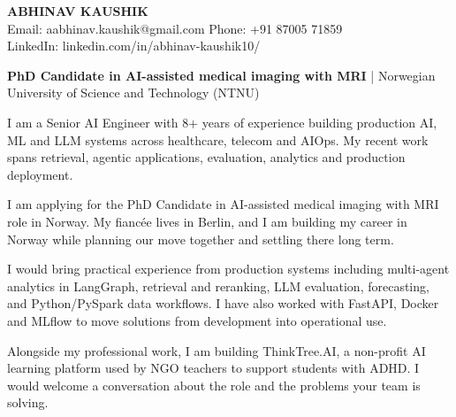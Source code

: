 \documentclass[10pt,a4paper]{article}
\begin{document}
\begin{center}
{\Large\bfseries ABHINAV KAUSHIK}\\[1pt]
Email: aabhinav.kaushik@gmail.com \quad Phone: +91 87005 71859\\
LinkedIn: linkedin.com/in/abhinav-kaushik10/
\end{center}
\vspace{10pt}
\textbf{PhD Candidate in AI-assisted medical imaging with MRI} | Norwegian University of Science and Technology (NTNU)\par\vspace{8pt}
I am a Senior AI Engineer with 8+ years of experience building production AI, ML and LLM systems across healthcare, telecom and AIOps. My recent work spans retrieval, agentic applications, evaluation, analytics and production deployment.

I am applying for the PhD Candidate in AI-assisted medical imaging with MRI role in Norway. My fiancée lives in Berlin, and I am building my career in Norway while planning our move together and settling there long term.

I would bring practical experience from production systems including multi-agent analytics in LangGraph, retrieval and reranking, LLM evaluation, forecasting, and Python/PySpark data workflows. I have also worked with FastAPI, Docker and MLflow to move solutions from development into operational use.

Alongside my professional work, I am building ThinkTree.AI, a non-profit AI learning platform used by NGO teachers to support students with ADHD. I would welcome a conversation about the role and the problems your team is solving.
\end{document}
